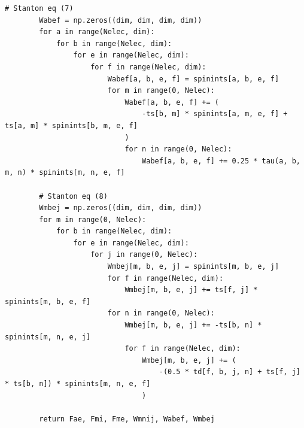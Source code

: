 \begin{lstlisting}[style=MyPython]
        # Stanton eq (7)
        Wabef = np.zeros((dim, dim, dim, dim))
        for a in range(Nelec, dim):
            for b in range(Nelec, dim):
                for e in range(Nelec, dim):
                    for f in range(Nelec, dim):
                        Wabef[a, b, e, f] = spinints[a, b, e, f]
                        for m in range(0, Nelec):
                            Wabef[a, b, e, f] += (
                                -ts[b, m] * spinints[a, m, e, f] + ts[a, m] * spinints[b, m, e, f]
                            )
                            for n in range(0, Nelec):
                                Wabef[a, b, e, f] += 0.25 * tau(a, b, m, n) * spinints[m, n, e, f]

        # Stanton eq (8)
        Wmbej = np.zeros((dim, dim, dim, dim))
        for m in range(0, Nelec):
            for b in range(Nelec, dim):
                for e in range(Nelec, dim):
                    for j in range(0, Nelec):
                        Wmbej[m, b, e, j] = spinints[m, b, e, j]
                        for f in range(Nelec, dim):
                            Wmbej[m, b, e, j] += ts[f, j] * spinints[m, b, e, f]
                        for n in range(0, Nelec):
                            Wmbej[m, b, e, j] += -ts[b, n] * spinints[m, n, e, j]
                            for f in range(Nelec, dim):
                                Wmbej[m, b, e, j] += (
                                    -(0.5 * td[f, b, j, n] + ts[f, j] * ts[b, n]) * spinints[m, n, e, f]
                                )

        return Fae, Fmi, Fme, Wmnij, Wabef, Wmbej
\end{lstlisting}

\vspace{10pt}

